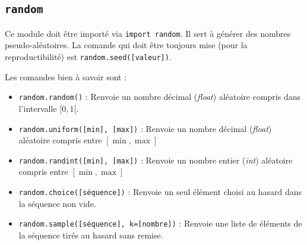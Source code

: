 \subsection{\texttt{random}}

Ce module doit être importé via \texttt{import random}. Il sert à générer des nombres pseudo-aléatoires. La comande qui doit être toujours mise (pour la reproductibilité) est \texttt{random.seed([valeur])}. 

Les comandes bien à savoir sont :

\begin{itemize}
\item \texttt{random.random()} : Renvoie un nombre décimal (\textit{float}) aléatoire compris dans l'intervalle $[0,1[$.
\item \texttt{random.uniform([min], [max])} : Renvoie un nombre décimal (\textit{float}) aléatoire compris entre $[\min, \max]$
\item \texttt{random.randint([min], [max])} :  Renvoie un nombre entier (\textit{int}) aléatoire compris entre $[\min, \max]$
\item \texttt{random.choice([séquence])} : Renvoie un seul élément choisi au hasard dans la séquence non vide.
\item \texttt{random.sample([séquence], k=[nombre])} : Renvoie une liste de éléments de la séquence tirés au hasard sans remise.
\end{itemize}
